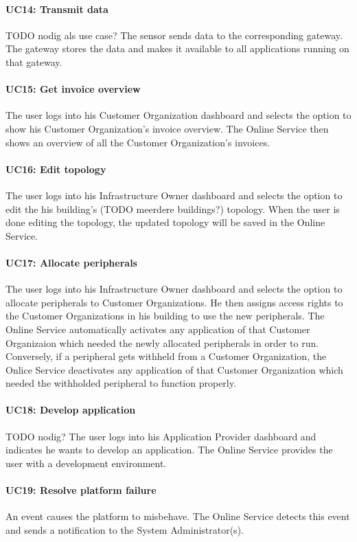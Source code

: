 \documentclass[english]{sareport}
\begin{document}
\paragraph{UC14: Transmit data}
TODO nodig als use case?
The sensor sends data to the corresponding gateway. The gateway stores the data and makes it available to all applications running on that gateway.

\paragraph{UC15: Get invoice overview}
The user logs into his Customer Organization dashboard and selects the option to show his Customer Organization's invoice overview. The Online Service then shows an overview of all the Customer Organization's invoices.

\paragraph{UC16: Edit topology}
The user logs into his Infrastructure Owner dashboard and selects the option to edit the his building's (TODO meerdere buildings?) topology. When the user is done editing the topology, the updated topology will be saved in the Online Service.

\paragraph{UC17: Allocate peripherals}
The user logs into his Infrastructure Owner dashboard and selects the option to allocate peripherals to Customer Organizations. He then assigns access rights to the Customer Organizations in his building to use the new peripherals. The Online Service automatically activates any application of that Customer Organizaion which needed the newly allocated peripherals in order to run. Conversely, if a peripheral gets withheld from a Customer Organization, the Onlice Service deactivates any application of that Customer Organization which needed the withholded peripheral to function properly.

\paragraph{UC18: Develop application}
TODO nodig? 
The user logs into his Application Provider dashboard and indicates he wants to develop an application.
The Online Service provides the user with a development environment.

\paragraph{UC19: Resolve platform failure}
An event causes the platform to misbehave. The Online Service detects this event and sends a notification to the System Administrator(s).
\end{document}
